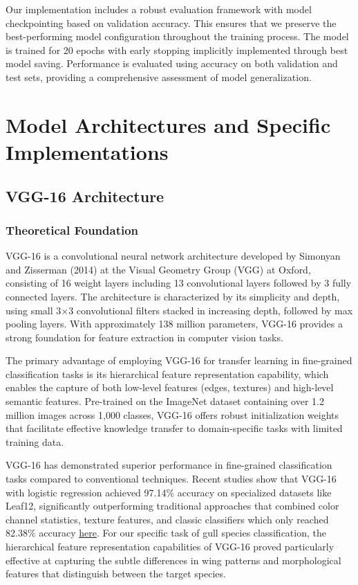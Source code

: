 \documentclass[a4paper,12pt]{article}
\begin{document}
Our implementation includes a robust evaluation framework with model checkpointing based on validation accuracy. This ensures that we preserve the best-performing model configuration throughout the training process. The model is trained for 20 epochs with early stopping implicitly implemented through best model saving. Performance is evaluated using accuracy on both validation and test sets, providing a comprehensive assessment of model generalization.

\section{Model Architectures and Specific Implementations}

\subsection{VGG-16 Architecture}

\subsubsection{Theoretical Foundation}

VGG-16 is a convolutional neural network architecture developed by Simonyan and Zisserman (2014) at the Visual Geometry Group (VGG) at Oxford, consisting of 16 weight layers including 13 convolutional layers followed by 3 fully connected layers. The architecture is characterized by its simplicity and depth, using small 3×3 convolutional filters stacked in increasing depth, followed by max pooling layers. With approximately 138 million parameters, VGG-16 provides a strong foundation for feature extraction in computer vision tasks.

The primary advantage of employing VGG-16 for transfer learning in fine-grained classification tasks is its hierarchical feature representation capability, which enables the capture of both low-level features (edges, textures) and high-level semantic features. Pre-trained on the ImageNet dataset containing over 1.2 million images across 1,000 classes, VGG-16 offers robust initialization weights that facilitate effective knowledge transfer to domain-specific tasks with limited training data.

VGG-16 has demonstrated superior performance in fine-grained classification tasks compared to conventional techniques. Recent studies show that VGG-16 with logistic regression achieved 97.14\% accuracy on specialized datasets like Leaf12, significantly outperforming traditional approaches that combined color channel statistics, texture features, and classic classifiers which only reached 82.38\% accuracy \href{https://doi.org/10.3233/JIFS-169911}{here}. For our specific task of gull species classification, the hierarchical feature representation capabilities of VGG-16 proved particularly effective at capturing the subtle differences in wing patterns and morphological features that distinguish between the target species.
\end{document}
